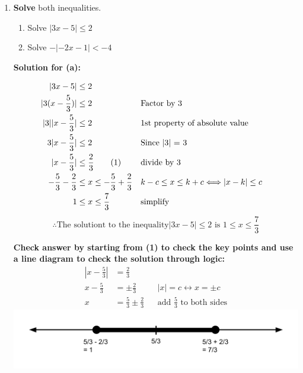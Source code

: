 \documentclass[12pt]{book}
\newcommand\numberthis{\addtocounter{equation}{1}\tag{\theequation}}
\begin{document}
\begin{enumerate}

\newpage

\item \textbf{Solve} both inequalities.

\begin{enumerate}
\item Solve $|3x-5| \le 2$
\item Solve $-|-2x-1| < -4$
\end{enumerate}

\vspace{0.3cm} 
\textbf{Solution for (a):}

\addtolength{\jot}{1.5em}
\begin{align*}
    |3x-5| & \le 2 \\
    |3(x - \frac{5}{3})| & \le 2 && \text{Factor by 3}\\
    |3||x - \frac{5}{3}| & \le 2 && \text{1st property of absolute value}\\
    3|x - \frac{5}{3}| & \le 2 && \text{Since |3| = 3}\\
    |x - \frac{5}{3}| & \le \frac{2}{3} \numberthis &&  \text{divide by 3}\\
    -\frac{5}{3} - \frac{2}{3} & \leq x \leq -\frac{5}{3} + \frac{2}{3} && k - c \leq x \leq k + c \Longleftrightarrow |x-k| \leq c \\
    1 & \le x \le \frac{7}{3} && \text{simplify}
\end{align*}
$$ \therefore \text{The solutiont to the inequality} |3x-5| \le 2 \text{ is } \boxed{1 \le x \le \frac{7}{3}} $$

\vspace{0.5em}
\textbf{Check answer by starting from (1) to check the key points and use a line diagram to check the solution through logic:}
\vspace{0.2em}
\addtolength{\jot}{0em}
\begin{align*}
    |x - \frac{5}{3}| & = \frac{2}{3}\\
    x - \frac{5}{3} & = \pm \frac{2}{3} && |x| = c \longleftrightarrow x = \pm c\\
    x & = \frac{5}{3} \pm \frac{2}{3} && \text{add $\frac{5}{3}$ to both sides}
\end{align*}
\includegraphics[width=\linewidth]{A1-2 proof 1 (1).png}


\end{enumerate}
\end{document}
